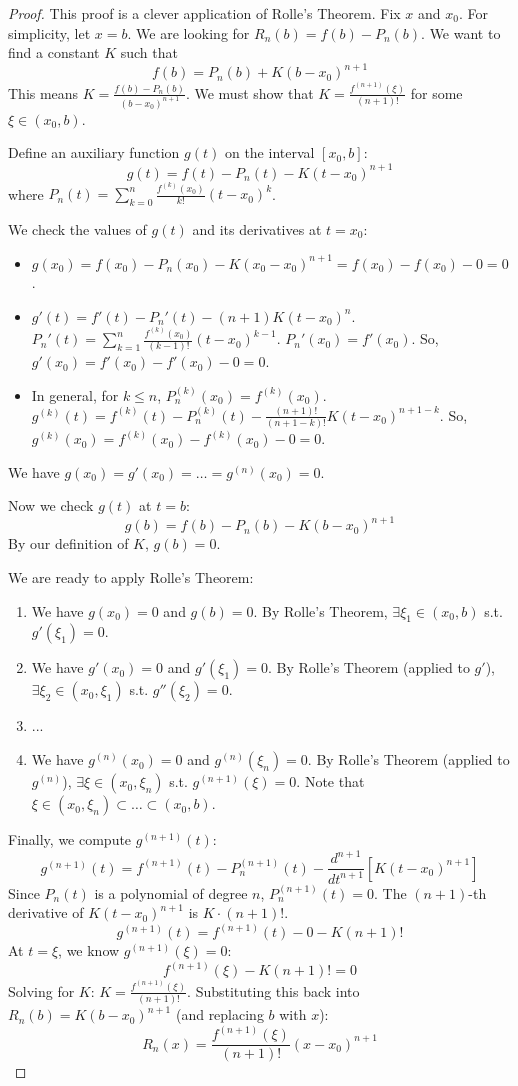 \begin{proof}
This proof is a clever application of Rolle's Theorem.
Fix $x$ and $x_0$. For simplicity, let $x=b$. We are looking for $R_n(b) = f(b) - P_n(b)$.
We want to find a constant $K$ such that
\[
f(b) = P_n(b) + K(b-x_0)^{n+1}
\]
This means $K = \frac{f(b) - P_n(b)}{(b-x_0)^{n+1}}$. We must show that $K = \frac{f^{(n+1)}(\xi)}{(n+1)!}$ for some $\xi \in (x_0, b)$.

Define an auxiliary function $g(t)$ on the interval $[x_0, b]$:
\[
g(t) = f(t) - P_n(t) - K(t-x_0)^{n+1}
\]
where $P_n(t) = \sum_{k=0}^n \frac{f^{(k)}(x_0)}{k!} (t-x_0)^k$.

We check the values of $g(t)$ and its derivatives at $t=x_0$:
\begin{itemize}
    \item $g(x_0) = f(x_0) - P_n(x_0) - K(x_0-x_0)^{n+1} = f(x_0) - f(x_0) - 0 = 0$.
    \item $g'(t) = f'(t) - P_n'(t) - (n+1)K(t-x_0)^n$.
    $P_n'(t) = \sum_{k=1}^n \frac{f^{(k)}(x_0)}{(k-1)!} (t-x_0)^{k-1}$.
    $P_n'(x_0) = f'(x_0)$. So, $g'(x_0) = f'(x_0) - f'(x_0) - 0 = 0$.
    \item In general, for $k \leq n$, $P_n^{(k)}(x_0) = f^{(k)}(x_0)$.
    $g^{(k)}(t) = f^{(k)}(t) - P_n^{(k)}(t) - \frac{(n+1)!}{(n+1-k)!}K(t-x_0)^{n+1-k}$.
    So, $g^{(k)}(x_0) = f^{(k)}(x_0) - f^{(k)}(x_0) - 0 = 0$.
\end{itemize}
We have $g(x_0) = g'(x_0) = \dots = g^{(n)}(x_0) = 0$.

Now we check $g(t)$ at $t=b$:
\[
g(b) = f(b) - P_n(b) - K(b-x_0)^{n+1}
\]
By our definition of $K$, $g(b) = 0$.

We are ready to apply Rolle's Theorem:
\begin{enumerate}
    \item We have $g(x_0) = 0$ and $g(b) = 0$. By Rolle's Theorem, $\exists \xi_1 \in (x_0, b)$ s.t. $g'(\xi_1) = 0$.
    \item We have $g'(x_0) = 0$ and $g'(\xi_1) = 0$. By Rolle's Theorem (applied to $g'$), $\exists \xi_2 \in (x_0, \xi_1)$ s.t. $g''(\xi_2) = 0$.
    \item ...
    \item We have $g^{(n)}(x_0) = 0$ and $g^{(n)}(\xi_n) = 0$. By Rolle's Theorem (applied to $g^{(n)}$), $\exists \xi \in (x_0, \xi_n)$ s.t. $g^{(n+1)}(\xi) = 0$.
    Note that $\xi \in (x_0, \xi_n) \subset \dots \subset (x_0, b)$.
\end{enumerate}
Finally, we compute $g^{(n+1)}(t)$:
\[
g^{(n+1)}(t) = f^{(n+1)}(t) - P_n^{(n+1)}(t) - \frac{d^{n+1}}{dt^{n+1}}[K(t-x_0)^{n+1}]
\]
Since $P_n(t)$ is a polynomial of degree $n$, $P_n^{(n+1)}(t) = 0$.
The $(n+1)$-th derivative of $K(t-x_0)^{n+1}$ is $K \cdot (n+1)!$.
\[
g^{(n+1)}(t) = f^{(n+1)}(t) - 0 - K(n+1)!
\]
At $t=\xi$, we know $g^{(n+1)}(\xi) = 0$:
\[
f^{(n+1)}(\xi) - K(n+1)! = 0
\]
Solving for $K$: $K = \frac{f^{(n+1)}(\xi)}{(n+1)!}$.
Substituting this back into $R_n(b) = K(b-x_0)^{n+1}$ (and replacing $b$ with $x$):
\[
R_n(x) = \frac{f^{(n+1)}(\xi)}{(n+1)!} (x-x_0)^{n+1}
\]
\end{proof}

